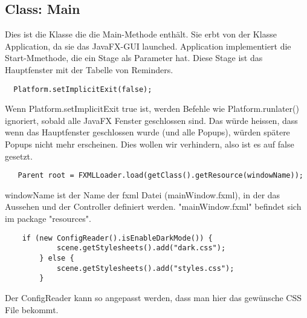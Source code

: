 \subsection{Class: Main}
Dies ist die Klasse die die Main-Methode enthält. Sie erbt von der Klasse Application, da sie das JavaFX-GUI launched.
Application implementiert die Start-Mmethode, die ein Stage als Parameter hat. Diese Stage ist das Hauptfenster mit der Tabelle von Reminders.

\begin{lstlisting}
  Platform.setImplicitExit(false);
\end{lstlisting}
Wenn Platform.setImplicitExit true ist, werden Befehle wie Platform.runlater() ignoriert, sobald alle JavaFX Fenster geschlossen sind.
Das würde heissen, dass wenn das Hauptfenster geschlossen wurde (und alle Popups), würden spätere Popups nicht mehr erscheinen.
Dies wollen wir verhindern, also ist es auf false gesetzt.

\begin{lstlisting}
   Parent root = FXMLLoader.load(getClass().getResource(windowName));
\end{lstlisting}
windowName ist der Name der fxml Datei (mainWindow.fxml), in der das Aussehen und der Controller definiert werden. "mainWindow.fxml" befindet sich im package "resources".


\begin{lstlisting}
    if (new ConfigReader().isEnableDarkMode()) {
            scene.getStylesheets().add("dark.css");
        } else {
            scene.getStylesheets().add("styles.css");
        }
\end{lstlisting}
Der ConfigReader kann so angepasst werden, dass man hier das gewünsche CSS File bekommt.
